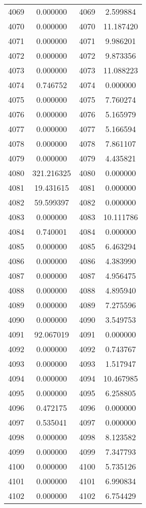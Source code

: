\documentclass[12pt]{article}
\begin{document}
\begin{longtable}{@{}cccc@{}}
4069 & 0.000000 & 4069 & 2.599884 \\
4070 & 0.000000 & 4070 & 11.187420 \\
4071 & 0.000000 & 4071 & 9.986201 \\
4072 & 0.000000 & 4072 & 9.873356 \\
4073 & 0.000000 & 4073 & 11.088223 \\
4074 & 0.746752 & 4074 & 0.000000 \\
4075 & 0.000000 & 4075 & 7.760274 \\
4076 & 0.000000 & 4076 & 5.165979 \\
4077 & 0.000000 & 4077 & 5.166594 \\
4078 & 0.000000 & 4078 & 7.861107 \\
4079 & 0.000000 & 4079 & 4.435821 \\
4080 & 321.216325 & 4080 & 0.000000 \\
4081 & 19.431615 & 4081 & 0.000000 \\
4082 & 59.599397 & 4082 & 0.000000 \\
4083 & 0.000000 & 4083 & 10.111786 \\
4084 & 0.740001 & 4084 & 0.000000 \\
4085 & 0.000000 & 4085 & 6.463294 \\
4086 & 0.000000 & 4086 & 4.383990 \\
4087 & 0.000000 & 4087 & 4.956475 \\
4088 & 0.000000 & 4088 & 4.895940 \\
4089 & 0.000000 & 4089 & 7.275596 \\
4090 & 0.000000 & 4090 & 3.549753 \\
4091 & 92.067019 & 4091 & 0.000000 \\
4092 & 0.000000 & 4092 & 0.743767 \\
4093 & 0.000000 & 4093 & 1.517947 \\
4094 & 0.000000 & 4094 & 10.467985 \\
4095 & 0.000000 & 4095 & 6.258805 \\
4096 & 0.472175 & 4096 & 0.000000 \\
4097 & 0.535041 & 4097 & 0.000000 \\
4098 & 0.000000 & 4098 & 8.123582 \\
4099 & 0.000000 & 4099 & 7.347793 \\
4100 & 0.000000 & 4100 & 5.735126 \\
4101 & 0.000000 & 4101 & 6.990834 \\
4102 & 0.000000 & 4102 & 6.754429 \\

\end{longtable}
\end{document}
